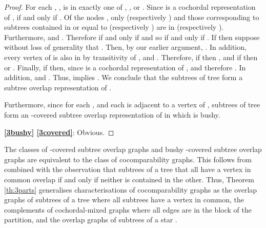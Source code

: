 \documentclass[
final
]{dmtcs-episciences}        \usepackage{graphics, amsthm, amsmath, amssymb, algorithm, algorithmic}
\begin{document}
\begin{proof}
For each , ,  is in exactly one of , , or .
Since  is a cochordal representation of ,  if and only if .
Of the nodes , only  (respectively ) and those corresponding to subtrees contained in or equal to  (respectively ) are in  (respectively ). Furthermore,  and . Therefore  if and only if   and so  if and only if .
If  then suppose without loss of generality that . Then, by our earlier argument, . In addition, every vertex of  is also in  by transitivity of  , and .
Therefore, 
if  then , and
if  then  or .
Finally, if  then,
since  is a cochordal representation of ,  and therefore 
. In addition,  and .
Thus,   implies . We conclude that the subtrees  of tree  form a subtree overlap representation of .

Furthermore, since for each ,  and each  is adjacent to a vertex of , subtrees  of tree  form an -covered subtree overlap representation of  in which  is bushy.

\textbf{\ref{3bushy}  \ref{3covered}}: Obvious.
\end{proof}

The classes of -covered subtree overlap graphs and bushy -covered subtree overlap graphs are equivalent to the class of cocomparability graphs. 
This follows from \cite{GolSch} combined with the observation that subtrees of a tree that all have a vertex in common overlap if and only if neither is contained in the other.
Thus, Theorem \ref{th:3parts}
generalises characterisations of cocomparability graphs as the overlap graphs of subtrees of a tree where all subtrees have a vertex in common, the complements of cochordal-mixed graphs where all edges are in the  block of the partition, and the overlap graphs of subtrees of a star \cite{eowynStewart, gavril2000, GolSch}.
\end{document}
